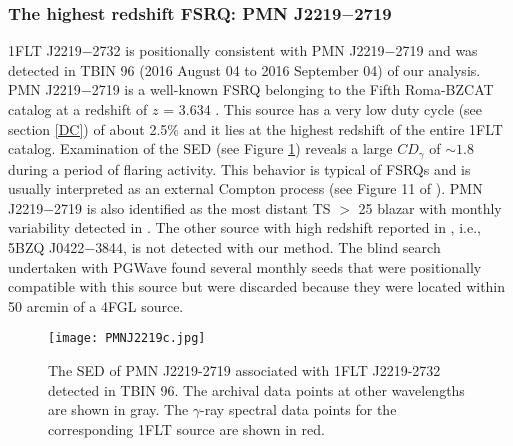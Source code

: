 \documentclass{aastex62}
\begin{document}
\subsubsection{The highest redshift FSRQ: PMN J2219$-$2719}
1FLT J2219$-$2732 is  positionally consistent with PMN J2219$-$2719 and was detected in TBIN 96 (2016 August 04 to 2016 September 04) of our analysis. PMN J2219$-$2719 is a well-known FSRQ belonging to the Fifth Roma-BZCAT catalog \citep{massaro2014optical} at a redshift of $z$ = 3.634 \citep{hook2002discovery}. This source has a very low duty cycle (see section \ref{DC}) of about 2.5\% and it lies at the highest redshift of the entire 1FLT catalog. Examination of the SED (see Figure  \ref{figure:PMNJ2219-2719}) reveals a  large $CD_{\gamma}$ of $\sim 1.8$ during a period of flaring activity. This behavior is typical of FSRQs and is usually interpreted as an external Compton process (see Figure 11 of \citealt{abdo2010pks}). PMN J2219$-$2719 is also identified as the most distant TS $>$ 25 blazar with monthly variability detected in \citet{kreter2020search}. The other source with high redshift reported in \citet{kreter2020search}, i.e., 5BZQ J0422$-$3844, is not detected with our method. The blind search undertaken with PGWave found several monthly seeds that were positionally compatible with this source but were discarded because they were located within 50 arcmin of a 4FGL source.
\begin{figure}[hbt!]
    \centering
    \texttt{[image: PMNJ2219c.jpg]}
    \caption{The SED of PMN J2219-2719 associated with 1FLT J2219-2732 detected in TBIN 96. The archival data points at other wavelengths are shown in gray. The $\gamma$-ray spectral data points for the corresponding 1FLT source are shown in red.}\label{figure:PMNJ2219-2719}
\end{figure}
\end{document}

